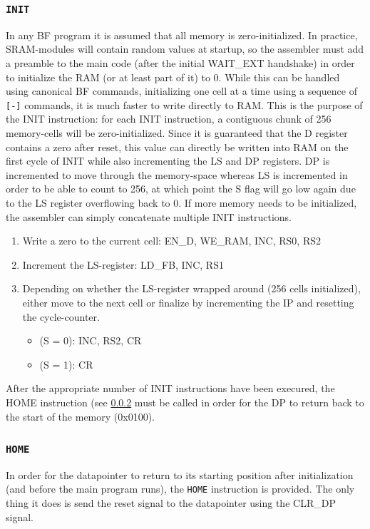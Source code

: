 \subsubsection{\texttt{INIT}} \label{sec:sequences:init}
In any BF program it is assumed that all memory is zero-initialized. In practice, SRAM-modules will contain random values at startup, so the assembler must add a preamble to the main code (after the initial WAIT\_EXT handshake) in order to initialize the RAM (or at least part of it) to 0. While this can be handled using canonical BF commands, initializing one cell at a time using a sequence of \texttt{[-]} commands, it is much faster to write directly to RAM. This is the purpose of the INIT instruction: for each INIT instruction, a contiguous chunk of 256 memory-cells will be zero-initialized. Since it is guaranteed that the D register contains a zero after reset, this value can directly be written into RAM on the first cycle of INIT while also incrementing the LS and DP registers. DP is incremented to move through the memory-space whereas LS is incremented in order to be able to count to 256, at which point the S flag will go low again due to the LS register overflowing back to 0. If more memory needs to be initialized, the assembler can simply concatenate multiple INIT instructions.
\begin{enumerate}
\item Write a zero to the current cell: EN\_D, WE\_RAM, INC, RS0, RS2
\item Increment the LS-register: LD\_FB, INC, RS1
\item Depending on whether the LS-register wrapped around (256 cells initialized), either move to the next cell or finalize by incrementing the IP and resetting the cycle-counter.
  \begin{itemize}
  \item (S = 0): INC, RS2, CR
  \item (S = 1): CR
  \end{itemize}
\end{enumerate}
After the appropriate number of INIT instructions have been execured, the HOME instruction (see \ref{sec:sequences:home} must be called in order for the DP to return back to the start of the memory (0x0100).

\subsubsection{\texttt{HOME}} \label{sec:sequences:home}
In order for the datapointer to return to its starting position after initialization (and before the main program runs), the \texttt{HOME} instruction is provided. The only thing it does is send the reset signal to the datapointer using the CLR\_DP signal.

